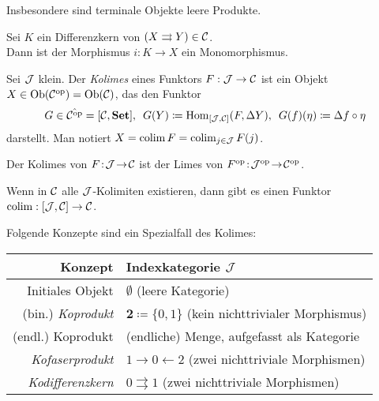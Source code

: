 \documentclass{cheat-sheet}
\begin{document}
\begin{bem}
  Insbesondere sind terminale Objekte leere Produkte.
\end{bem}

\begin{lem}
  Sei $K$ ein Differenzkern von $(X \rightrightarrows Y) \in \mathcal{C}$. \\
  Dann ist der Morphismus $i : K \to X$ ein Monomorphismus.
\end{lem}


\begin{defn}
  Sei $\mathcal{J}$ klein.
  Der \emph{Kolimes} eines Funktors $F : \mathcal{J} \to \mathcal{C}$ ist ein Objekt $X \in \operatorname{Ob}(\mathcal{C}^{\mathrm{op}}) = \operatorname{Ob}(\mathcal{C})$, das den Funktor
  \[
    G \in \hat{\mathcal{C}^{\mathrm{op}}} = [\mathcal{C}, \mathbf{Set}], \enspace
    G(Y) \coloneqq \operatorname{Hom}_{[\mathcal{J}, \mathcal{C}]}(F, \Delta Y), \enspace
    G(f)(\eta) \coloneqq \Delta f \circ \eta
  \]
  darstellt. Man notiert $X = \operatorname{colim} F = \operatorname{colim}_{j \in \mathcal{J}} F(j)$.
\end{defn}

\begin{bem}
  Der Kolimes von $F \!:\! \mathcal{J} \!\to\! \mathcal{C}$ ist der Limes von $F^{\mathrm{op}} \!:\! \mathcal{J}^{\mathrm{op}} \!\to\! \mathcal{C}^{\mathrm{op}}$.
\end{bem}

\begin{bem}
  Wenn in $\mathcal{C}$ alle $\mathcal{J}$-Kolimiten existieren, dann gibt es einen Funktor $\operatorname{colim} : [\mathcal{J}, \mathcal{C}] \to \mathcal{C}$.
\end{bem}

\begin{bem}
  Folgende Konzepte sind ein Spezialfall des Kolimes:
  \begin{center}
    \begin{tabular}{ | r | l | }
      \hline
      Konzept & Indexkategorie $\mathcal{J}$ \\ \hline
      Initiales Objekt & $\emptyset$ (leere Kategorie) \\
      (bin.) \emph{Koprodukt} & $\mathbf{2} \coloneqq \{ 0, 1 \}$ (kein nichttrivialer Morphismus) \\
      (endl.) Koprodukt & (endliche) Menge, aufgefasst als Kategorie \\
      \emph{Kofaserprodukt} & $1 \to 0 \leftarrow 2$ (zwei nichttriviale Morphismen) \\
      \emph{Kodifferenzkern} &  $0 \rightrightarrows 1$ (zwei nichttriviale Morphismen) \\ \hline
    \end{tabular}
  \end{center}
\end{bem}
\end{document}
